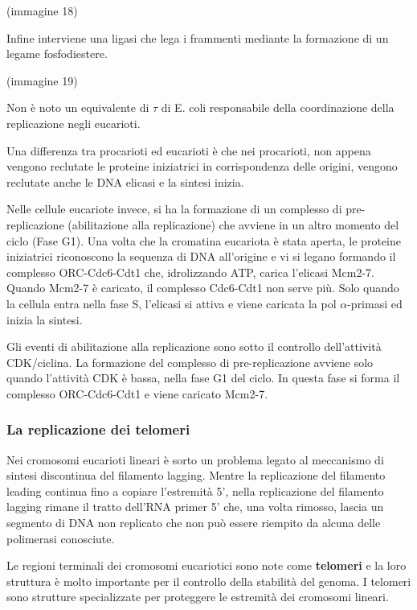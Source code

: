 \documentclass[]{article}
\begin{document}
(immagine 18)

Infine interviene una ligasi che lega i frammenti mediante la formazione
di un legame fosfodiestere.

(immagine 19)

Non è noto un equivalente di \(\tau\) di E. coli responsabile della
coordinazione della replicazione negli eucarioti.

Una differenza tra procarioti ed eucarioti è che nei procarioti, non
appena vengono reclutate le proteine iniziatrici in corrispondenza delle
origini, vengono reclutate anche le DNA elicasi e la sintesi inizia.

Nelle cellule eucariote invece, si ha la formazione di un complesso di
pre-replicazione (abilitazione alla replicazione) che avviene in un
altro momento del ciclo (Fase G1). Una volta che la cromatina eucariota
è stata aperta, le proteine iniziatrici riconoscono la sequenza di DNA
all'origine e vi si legano formando il complesso ORC-Cdc6-Cdt1 che,
idrolizzando ATP, carica l'elicasi Mcm2-7. Quando Mcm2-7 è caricato, il
complesso Cdc6-Cdt1 non serve più. Solo quando la cellula entra nella
fase S, l'elicasi si attiva e viene caricata la pol \(\alpha\)-primasi
ed inizia la sintesi.

Gli eventi di abilitazione alla replicazione sono sotto il controllo
dell'attività CDK/ciclina. La formazione del complesso di
pre-replicazione avviene solo quando l'attività CDK è bassa, nella fase
G1 del ciclo. In questa fase si forma il complesso ORC-Cdc6-Cdt1 e viene
caricato Mcm2-7.

\subsubsection{La replicazione dei
telomeri}\label{la-replicazione-dei-telomeri}

Nei cromosomi eucarioti lineari è sorto un problema legato al meccanismo
di sintesi discontinua del filamento lagging. Mentre la replicazione del
filamento leading continua fino a copiare l'estremità 5', nella
replicazione del filamento lagging rimane il tratto dell'RNA primer 5'
che, una volta rimosso, lascia un segmento di DNA non replicato che non
può essere riempito da alcuna delle polimerasi conosciute.

Le regioni terminali dei cromosomi eucariotici sono note come
\textbf{telomeri} e la loro struttura è molto importante per il
controllo della stabilità del genoma. I telomeri sono strutture
specializzate per proteggere le estremità dei cromosomi lineari.
\end{document}
